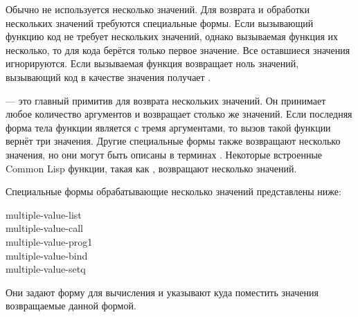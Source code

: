Обычно не используется несколько значений. Для возврата и обработки нескольких
значений требуются специальные формы.
Если вызывающий функцию код не требует нескольких значений, однако вызываемая
функция их несколько, то для кода берётся только первое значение. Все оставшиеся
значения игнорируются.
Если вызываемая функция возвращает ноль значений, вызывающий код в качестве
значения получает {\false}.

 --- это главный примитив для возврата нескольких значений. Он
принимает любое количество аргументов и возвращает столько же значений. Если
последняя форма тела функции является  с тремя аргументами, то вызов
такой функции вернёт три значения.
Другие специальные формы также возвращают несколько значения, но они могут быть
описаны в терминах . Некоторые встроенные Common Lisp функции, такая
как , возвращают несколько значений.

Специальные формы обрабатывающие несколько значений представлены ниже:
\begin{lisp}
multiple-value-list \\
multiple-value-call \\
multiple-value-prog1 \\
multiple-value-bind \\
multiple-value-setq
\end{lisp}
Они задают форму для вычисления и указывают куда поместить значения возвращаемые
данной формой.

